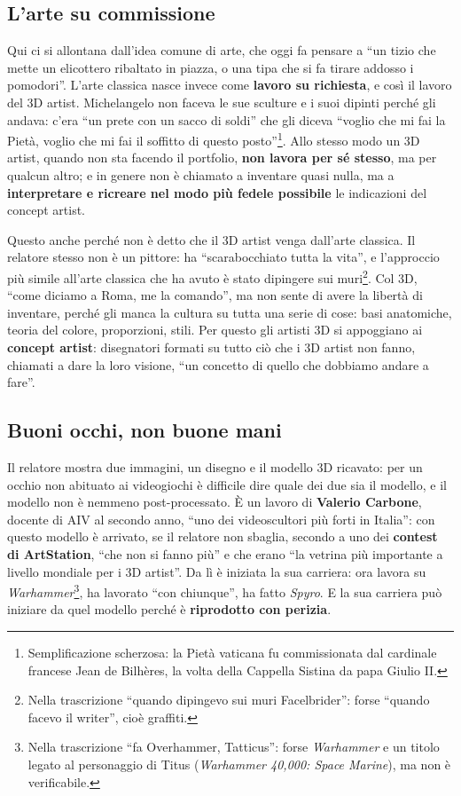 \subsection{L'arte su commissione}

Qui ci si allontana dall'idea comune di arte, che oggi fa pensare a ``un tizio
che mette un elicottero ribaltato in piazza, o una tipa che si fa tirare
addosso i pomodori''. L'arte classica nasce invece come \textbf{lavoro su
richiesta}, e così il lavoro del 3D artist. Michelangelo non faceva le sue
sculture e i suoi dipinti perché gli andava: c'era ``un prete con un sacco di
soldi'' che gli diceva ``voglio che mi fai la Pietà, voglio che mi fai il
soffitto di questo posto''\footnote{Semplificazione scherzosa: la Pietà
vaticana fu commissionata dal cardinale francese Jean de Bilhères, la volta
della Cappella Sistina da papa Giulio II.}. Allo stesso modo un 3D artist,
quando non sta facendo il portfolio, \textbf{non lavora per sé stesso}, ma per
qualcun altro; e in genere non è chiamato a inventare quasi nulla, ma a
\textbf{interpretare e ricreare nel modo più fedele possibile} le indicazioni
del concept artist.

Questo anche perché non è detto che il 3D artist venga dall'arte classica. Il
relatore stesso non è un pittore: ha ``scarabocchiato tutta la vita'', e
l'approccio più simile all'arte classica che ha avuto è stato dipingere sui
muri\footnote{Nella trascrizione ``quando dipingevo sui muri Facelbrider'':
forse ``quando facevo il writer'', cioè graffiti.}. Col 3D, ``come diciamo a
Roma, me la comando'', ma non sente di avere la libertà di inventare, perché gli
manca la cultura su tutta una serie di cose: basi anatomiche, teoria del
colore, proporzioni, stili. Per questo gli artisti 3D si appoggiano ai
\textbf{concept artist}: disegnatori formati su tutto ciò che i 3D artist non
fanno, chiamati a dare la loro visione, ``un concetto di quello che dobbiamo
andare a fare''.

\subsection{Buoni occhi, non buone mani}

Il relatore mostra due immagini, un disegno e il modello 3D ricavato: per un
occhio non abituato ai videogiochi è difficile dire quale dei due sia il
modello, e il modello non è nemmeno post-processato. È un lavoro di
\textbf{Valerio Carbone}, docente di AIV al secondo anno, ``uno dei
videoscultori più forti in Italia'': con questo modello è arrivato, se il
relatore non sbaglia, secondo a uno dei \textbf{contest di ArtStation}, ``che
non si fanno più'' e che erano ``la vetrina più importante a livello mondiale
per i 3D artist''. Da lì è iniziata la sua carriera: ora lavora su
\emph{Warhammer}\footnote{Nella trascrizione ``fa Overhammer, Tatticus'':
forse \emph{Warhammer} e un titolo legato al personaggio di Titus
(\emph{Warhammer 40,000: Space Marine}), ma non è verificabile.}, ha lavorato
``con chiunque'', ha fatto \emph{Spyro}. E la sua carriera può iniziare da
quel modello perché è \textbf{riprodotto con perizia}.

